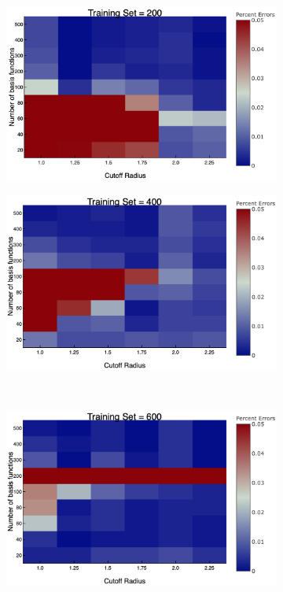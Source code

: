 \begin{figure}
  \centering
  \begin{subfigure}{0.5\textwidth}
    \includegraphics[width=\linewidth]{Figures/perErrors2}
    \caption{} 
    \label{perErrors2}
  \end{subfigure}%
  \hspace*{\fill}   %
  \begin{subfigure}{0.5\textwidth}
    \includegraphics[width=\linewidth]{Figures/perErrors4}
    \caption{} 
    \label{perErrors4}
  \end{subfigure}%
    \\
  \begin{subfigure}{0.5\textwidth}
    \includegraphics[width=\linewidth]{Figures/perErrors6}

\end{subfigure}
\end{figure}
